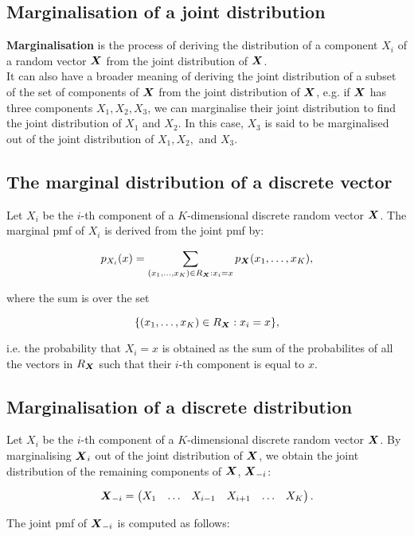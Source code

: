 \documentclass{report}
\begin{document}
	\subsection{Marginalisation of a joint distribution} %
	\textbf{Marginalisation} is the process of deriving the distribution of a component $X_i$ of a random vector $\boldsymbol{X}$ from the joint distribution of $\boldsymbol{X}$.\\
	
	It can also have a broader meaning of deriving the joint distribution of a subset of the set of components of $\boldsymbol{X}$ from the joint distribution of $\boldsymbol{X}$, e.g. if $\boldsymbol{X}$ has three components $X_1,X_2,X_3$, we can marginalise their joint distribution to find the joint distribution of $X_1$ and $X_2$. In this case, $X_3$ is said to be marginalised out of the joint distribution of $X_1,X_2,$ and $X_3$.
		
	\subsection{The marginal distribution of a discrete vector} %
	Let $X_i$ be the $i$-th component of a $K$-dimensional discrete random vector $\boldsymbol{X}$. The marginal pmf of $X_i$ is derived from the joint pmf by:
	
	$$p_{X_i}(x)=\sum_{(x_1,\ldots,x_K)\in R_{\boldsymbol{X}}:x_i=x}p_{\boldsymbol{X}}(x_1,\ldots,x_K),$$
	
	where the sum is over the set
	
	$$\{(x_1,\ldots,x_K)\in R_{\boldsymbol{X}}: x_i=x\},$$
		
	i.e. the probability that $X_i=x$ is obtained as the sum of the probabilites of all the vectors in $R_{\boldsymbol{X}}$ such that their $i$-th component is equal to $x$.
	
	\subsection{Marginalisation of a discrete distribution} %
	Let $X_i$ be the $i$-th component of a $K$-dimensional discrete random vector $\boldsymbol{X}$. By marginalising $\boldsymbol{X}_i$ out of the joint distribution of $\boldsymbol{X}$, we obtain the joint distribution of the remaining components of $\boldsymbol{X}$, $\boldsymbol{X}_{-i}$:
	
	$$\boldsymbol{X}_{-i}=\begin{pmatrix}
		X_1 & \ldots & X_{i-1} & X_{i+1} & \ldots & X_K
	\end{pmatrix}.$$
	
	The joint pmf of $\boldsymbol{X}_{-i}$ is computed as follows:
	
\end{document}
